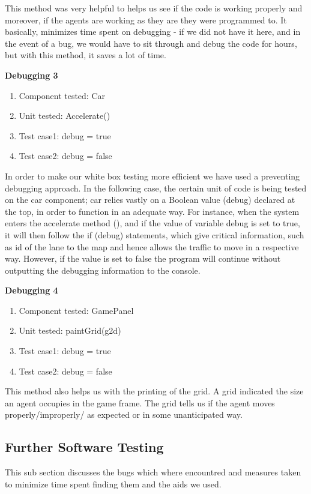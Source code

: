 This method was very helpful to helps us see if the code is working properly and moreover, if the agents are working as they are they were programmed to. It basically, minimizes time spent on debugging - if we did not have it here, and in the event of a bug, we would have to sit through and debug the code for hours, but with this method, it saves a lot of time. \newline


\textbf{Debugging 3}
\begin{enumerate}
\item Component tested: Car
\item Unit tested: Accelerate()
\item Test case1: debug  =  true 
\item Test case2: debug   =  false
\end{enumerate} 

In order to make our white box testing more efficient we have used a preventing debugging approach. In the following case, the certain unit of code is being tested on the car component; car relies vastly on a Boolean value (debug) declared at the top, in order to function in an adequate way. For instance, when the system enters the accelerate method (), and if the value of variable debug is set to true, it will then follow the if (debug) statements, which give critical information, such as id of the lane to the map and hence allows the traffic to move in a respective way. However, if the value is set to false the program will continue without outputting the debugging information to the console.\newline

\textbf{Debugging 4}
\begin{enumerate}
\item Component tested: GamePanel
\item Unit tested: paintGrid(g2d)
\item Test case1: debug  =  true 
\item Test case2: debug   =  false
\end{enumerate} 

This method also helps us with the printing of the grid. A grid indicated the size an agent occupies in the game frame. The grid tells us if the agent moves properly/improperly/ as expected or in some unanticipated way.

 
\subsection{Further Software Testing}
\indent This sub section discusses the bugs which where encountred and measures taken to minimize time spent finding them and the aids we used. 
